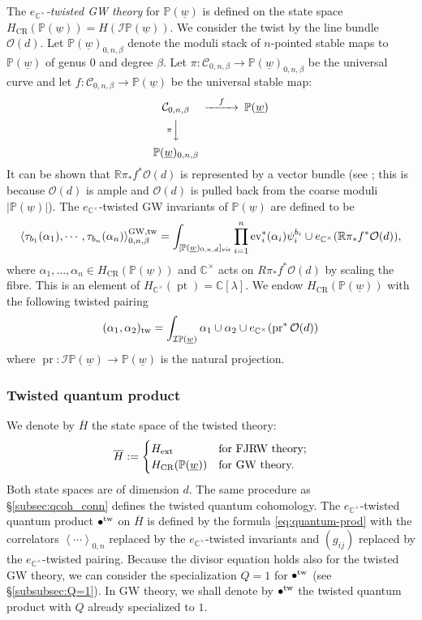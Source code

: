 \documentclass[11pt]{amsart}
\theoremstyle{definition} %
\theoremstyle{remark} %
\newcommand{\CC}{\mathbb C}
\newcommand{\PP}{\mathbb P}
\newcommand{\RR}{\mathbb R}
\newcommand{\pt}{\operatorname{pt}}
\newcommand{\ev}{{\rm ev}}
\newcommand{\tw}{{\rm tw}}
\def\GW{\operatorname{\text{GW}}}
\def\CR{\operatorname{\text{CR}}}
\def\corr#1{\left\langle #1 \right\rangle}
\newcommand{\cO}{\mathcal{O}}
\newcommand{\cC}{\mathcal{C}}
\newcommand{\cI}{\mathcal{I}}
\renewcommand{\GW}{{\operatorname{GW}}}
\renewcommand{\CR}{{\operatorname{CR}}}
\newcommand{\pr}{\operatorname{pr}}
\newcommand{\ov}{\overline}
\newcommand{\uw}{\underline{w}}
\begin{document}
The \emph{$e_{\CC^\times}$-twisted GW theory}  
\cite{Coates-Givental, Tseng, CCIT:computing} 
for $\PP(\uw)$ is defined on the state space 
$H_{\CR}(\PP(\uw)) = H(\cI\PP(\uw))$. 
We consider the twist by the line bundle $\cO(d)$.  
Let $\PP(\uw)_{0,n,\beta}$ denote the moduli stack of 
$n$-pointed stable maps to $\PP(\uw)$ 
of genus $0$ and degree $\beta$. 
Let $\pi\colon \cC_{0,n,\beta} \to \PP(\uw)_{0,n,\beta}$ be 
the universal curve 
and let $f \colon \cC_{0,n,\beta} \to \PP(\uw)$ 
be the universal stable map: 
\[
\begin{CD} 
\cC_{0,n,\beta} @>{f}>> \PP(\uw) \\ 
@V{\pi} VV @. \\ 
\PP(\uw)_{0,n,\beta} 
\end{CD} 
\]
It can be shown that $\RR\pi_* f^* \cO(d)$ is represented 
by a vector bundle (see \cite{6authors}; 
this is because $\cO(d)$ is ample and $\cO(d)$ is pulled back 
from the coarse moduli $|\PP(\uw)|$). 
The $e_{\CC^\times}$-twisted GW invariants  
of $\PP(\uw)$ are defined to be 
\[
\corr{\tau_{b_1}(\alpha_1),\cdots,\tau_{b_n}(\alpha_n)
}^{\GW, \rm tw}_{0,n,\beta} 
= \int_{[\PP(\uw)_{0,n,d}]_{\rm vir}} 
\prod_{i=1}^n \ev_i^*(\alpha_i) \psi_i^{b_i} 
\cup 
e_{\CC^\times} (\RR\pi_* f^* \cO(d)), 
\]
where $\alpha_1,\dots,\alpha_n\in H_{\CR}(\PP(\uw))$ 
and $\CC^\times$ acts on $R\pi_* f^* \cO(d)$ 
by scaling the fibre. 
This is an element of $H_{\CC^\times}(\pt) = \CC[\lambda]$. 
We endow $H_{\CR}(\PP(\uw))$ with the following twisted pairing 
\[
(\alpha_1,\alpha_2)_{\tw} = \int_{\cI \PP(\uw)} 
\alpha_1 \cup \alpha_2 \cup e_{\CC^\times}(\pr^*\cO(d)) 
\]
where $\pr \colon \cI\PP(\uw) \to \PP(\uw)$ is the natural 
projection. 

\subsubsection{Twisted quantum product}
\label{subsubsec:tw-quantum}

We denote by $\ov{H}$ the state space of the twisted theory:  
\begin{align*} 
\ov{H} := \begin{cases} 
H_{\rm ext}  & \text{for FJRW theory;} \\ 
H_{\CR}(\PP(\uw)) &\text{for GW theory.} 
\end{cases} 
\end{align*}
Both state spaces are of dimension $d$. 
The same procedure as \S \ref{subsec:qcoh_conn} 
defines the twisted quantum cohomology.  
The $e_{\CC^\times}$-twisted quantum product $\bullet^{\tw}$ 
on $\ov{H}$ is defined by the formula \eqref{eq:quantum-prod} 
with the correlators $\corr{\cdots}_{0,n}$ replaced by 
the $e_{\CC^\times}$-twisted invariants 
and $(g_{ij})$ replaced by the $e_{\CC^\times}$-twisted pairing. 
Because the divisor equation holds also for the twisted 
GW theory, we can consider the specialization 
$Q=1$ for $\bullet^{\tw}$ (see \S \ref{subsubsec:Q=1}).  
In GW theory, we shall denote by $\bullet^\tw$ 
the twisted quantum product with $Q$ already specialized to $1$. 
\end{document}

